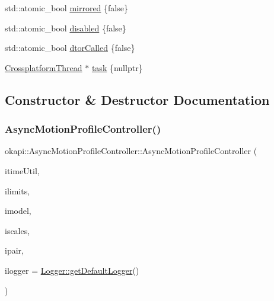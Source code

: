 \begin{DoxyCompactItemize}
\item 
std\+::atomic\+\_\+bool \mbox{\hyperlink{classokapi_1_1AsyncMotionProfileController_ac3eb4334e86030a0717ad424062abaab}{mirrored}} \{false\}
\item 
std\+::atomic\+\_\+bool \mbox{\hyperlink{classokapi_1_1AsyncMotionProfileController_a924ddedefab00c4e724dec77de37796f}{disabled}} \{false\}
\item 
std\+::atomic\+\_\+bool \mbox{\hyperlink{classokapi_1_1AsyncMotionProfileController_abd24ffe9b90ec6f85f1105d8f2bbf601}{dtor\+Called}} \{false\}
\item 
\mbox{\hyperlink{classCrossplatformThread}{Crossplatform\+Thread}} $\ast$ \mbox{\hyperlink{classokapi_1_1AsyncMotionProfileController_a9d62c3c449f8cb5db7a20d0d5dc87431}{task}} \{nullptr\}
\end{DoxyCompactItemize}


\subsection{Constructor \& Destructor Documentation}
\mbox{\label{classokapi_1_1AsyncMotionProfileController_a7552d4d18213b79ec0fc0e65a3294305}} 
\subsubsection{\texorpdfstring{AsyncMotionProfileController()}{AsyncMotionProfileController()}\hspace{0.1cm}{\footnotesize\ttfamily [1/2]}}
{\footnotesize\ttfamily okapi\+::\+Async\+Motion\+Profile\+Controller\+::\+Async\+Motion\+Profile\+Controller (\begin{DoxyParamCaption}\item[{const \mbox{\hyperlink{classokapi_1_1TimeUtil}{Time\+Util}} \&}]{itime\+Util,  }\item[{const \mbox{\hyperlink{structokapi_1_1PathfinderLimits}{Pathfinder\+Limits}} \&}]{ilimits,  }\item[{const std\+::shared\+\_\+ptr$<$ \mbox{\hyperlink{classokapi_1_1ChassisModel}{Chassis\+Model}} $>$ \&}]{imodel,  }\item[{const \mbox{\hyperlink{classokapi_1_1ChassisScales}{Chassis\+Scales}} \&}]{iscales,  }\item[{const \mbox{\hyperlink{structokapi_1_1AbstractMotor_1_1GearsetRatioPair}{Abstract\+Motor\+::\+Gearset\+Ratio\+Pair}} \&}]{ipair,  }\item[{const std\+::shared\+\_\+ptr$<$ \mbox{\hyperlink{classokapi_1_1Logger}{Logger}} $>$ \&}]{ilogger = {\ttfamily \mbox{\hyperlink{classokapi_1_1Logger_a5053cf778b4b55acba788a3797dc96d2}{Logger\+::get\+Default\+Logger}}()} }\end{DoxyParamCaption})}

